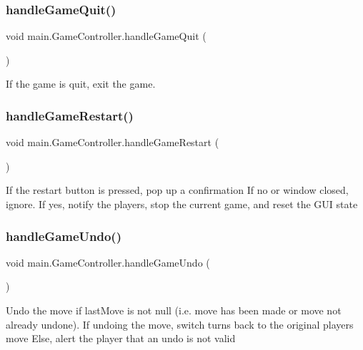 \subsubsection{\texorpdfstring{handle\+Game\+Quit()}{handleGameQuit()}}
{\footnotesize\ttfamily void main.\+Game\+Controller.\+handle\+Game\+Quit (\begin{DoxyParamCaption}{ }\end{DoxyParamCaption})}

If the game is quit, exit the game. \hypertarget{classmain_1_1_game_controller_a328600841ad583141ff90225ef520d82}{}\label{classmain_1_1_game_controller_a328600841ad583141ff90225ef520d82} 
\subsubsection{\texorpdfstring{handle\+Game\+Restart()}{handleGameRestart()}}
{\footnotesize\ttfamily void main.\+Game\+Controller.\+handle\+Game\+Restart (\begin{DoxyParamCaption}{ }\end{DoxyParamCaption})}

If the restart button is pressed, pop up a confirmation If no or window closed, ignore. If yes, notify the players, stop the current game, and reset the G\+UI state \hypertarget{classmain_1_1_game_controller_ac965ec2ce1c31547f9d219acca840629}{}\label{classmain_1_1_game_controller_ac965ec2ce1c31547f9d219acca840629} 
\subsubsection{\texorpdfstring{handle\+Game\+Undo()}{handleGameUndo()}}
{\footnotesize\ttfamily void main.\+Game\+Controller.\+handle\+Game\+Undo (\begin{DoxyParamCaption}{ }\end{DoxyParamCaption})}

Undo the move if last\+Move is not null (i.\+e. move has been made or move not already undone). If undoing the move, switch turns back to the original player\textquotesingle{}s move Else, alert the player that an undo is not valid \hypertarget{classmain_1_1_game_controller_a868da5d6ac8b5b1d1c90cfb3957e2c3d}{}\label{classmain_1_1_game_controller_a868da5d6ac8b5b1d1c90cfb3957e2c3d} 
